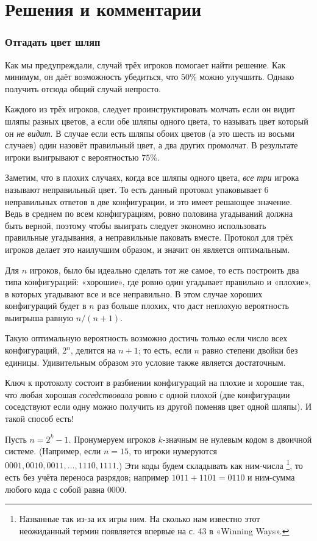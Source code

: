 \section*{Решения и комментарии}

\subsubsection*{Отгадать цвет шляп}

Как мы предупреждали, случай трёх игроков помогает найти решение.
Как минимум, он даёт возможность убедиться, что $50\%$ можно улучшить.
Однако получить отсюда общий случай непросто.

Каждого из трёх игроков, следует проинструктировать молчать если он видит шляпы разных цветов,
а если обе шляпы одного цвета, то называть цвет который он \emph{не видит}.
В случае если есть шляпы обоих цветов (а это шесть из восьми случаев) один назовёт правильный цвет, а два других промолчат.
В результате игроки выигрывают с вероятностью $75\%$.

Заметим, что в плохих случаях, когда все шляпы одного цвета, \emph{все три} игрока называют неправильный цвет.
То есть данный протокол упаковывает 6 неправильных ответов в две конфигурации, и это имеет решающее значение.
Ведь в среднем по всем конфигурациям, ровно половина угадываний должна быть верной, поэтому чтобы выиграть следует экономно использовать правильные угадывания, а неправильные паковать вместе.
Протокол для трёх игроков делает это наилучшим образом, и значит он является оптимальным.

Для $n$ игроков, было бы идеально сделать тот же самое,
то есть построить два типа конфигураций: «хорошие», где ровно один угадывает правильно и «плохие», в которых угадывают все и все неправильно.
В этом случае хороших конфигураций будет в $n$ раз больше плохих,
что даст неплохую вероятность выигрыша равную $n/(n+1)$.

Такую оптимальную вероятность возможно достичь только если число всех конфигураций, $2^n$, делится на $n+1$;
то есть, если $n$ равно степени двойки без единицы.
Удивительным образом это условие также является достаточным.

Ключ к протоколу состоит в разбиении конфигураций на плохие и хорошие так, что любая хорошая \emph{соседствовала} ровно с одной плохой (две конфигурации соседствуют если одну можно получить из другой поменяв цвет одной шляпы).
И такой способ есть!

Пусть $n=2^k-1$.
Пронумеруем игроков $k$-значным не нулевым кодом в двоичной системе.
(Например, если $n=15$, то игроки нумеруются $0001,0010,0011,\dots,1110,1111$.)
Эти коды будем складывать как ним-числа%
\footnote{Названные так из-за их игры ним.
На сколько нам известно этот неожиданный термин появляется впервые на с. 43 в «Winning Ways».}, то есть без учёта переноса разрядов;
например $1011 + 1101 =0110$ и ним-сумма любого кода с собой равна $0000$.

